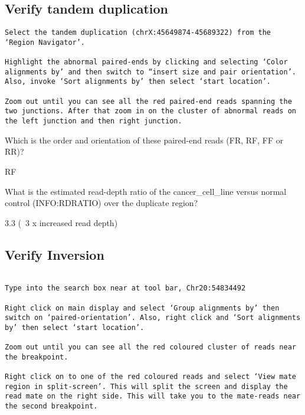 \subsection{Verify tandem duplication}
\begin{advanced}
\begin{lstlisting}
Select the tandem duplication (chrX:45649874-45689322) from the ‘Region Navigator’.

Highlight the abnormal paired-ends by clicking and selecting ‘Color alignments by’ and then switch to “insert size and pair orientation’. Also, invoke ‘Sort alignments by’ then select ‘start location’.

Zoom out until you can see all the red paired-end reads spanning the two junctions. After that zoom in on the cluster of abnormal reads on the left junction and then right junction.
\end{lstlisting}
\end{advanced}

\begin{questions}
Which is the order and orientation of these paired-end reads (FR, RF, FF or RR)? 
\begin{answer}
RF
\end{answer}
What is the estimated read-depth ratio of the cancer\_cell\_line versus normal control (INFO:RDRATIO) over the duplicate region? 
\begin{answer}
3.3 (~3 x increased read depth) 
\end{answer}
\end{questions}


\subsection{Verify Inversion}
\begin{advanced}
\begin{lstlisting}

Type into the search box near at tool bar, Chr20:54834492 

Right click on main display and select ‘Group alignments by’ then switch on ‘paired-orientation’. Also, right click and ‘Sort alignments by’ then select ‘start location’. 

Zoom out until you can see all the red coloured cluster of reads near the breakpoint. 

Right click on to one of the red coloured reads and select ‘View mate region in split-screen’. This will split the screen and display the read mate on the right side. This will take you to the mate-reads near the second breakpoint. 
\end{lstlisting}
\end{advanced}


